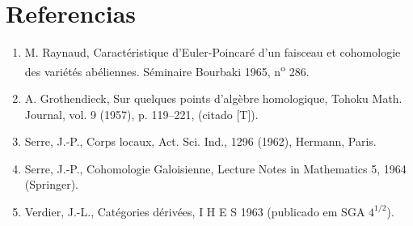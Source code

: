 \section*{Referencias}

\begin{enumerate}
\item[{[1]}] M. Raynaud, Caractéristique d'Euler-Poincaré d'un faisceau et cohomologie des variétés abéliennes. Séminaire Bourbaki 1965, n\textsuperscript{o} 286.
\item[{[2]}] A. Grothendieck, Sur quelques points d'algèbre homologique, Tohoku Math. Journal, vol. 9 (1957), p. 119--221, (citado [T]).
\item[{[3]}] Serre, J.-P., Corps locaux, Act. Sci. Ind., 1296 (1962), Hermann, Paris.
\item[{[4]}] Serre, J.-P., Cohomologie Galoisienne, Lecture Notes in Mathematics 5, 1964 (Springer).
\item[{[5]}] Verdier, J.-L., Catégories dérivées, I H E S 1963 (publicado em SGA $4^{1/2}$).
\end{enumerate}

